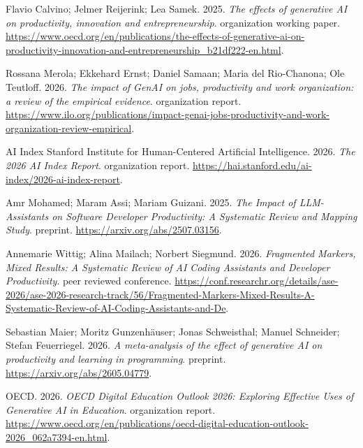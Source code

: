{\small\setlength{\parskip}{0pt}\begin{description}[leftmargin=2em,labelwidth=1.5em,itemsep=1pt,parsep=0pt]
\item[1.] \hypertarget{ref-oecdproductivity2025}{} Flavio Calvino; Jelmer Reijerink; Lea Samek. 2025. \textit{The effects of generative AI on productivity, innovation and entrepreneurship}. organization working paper. \url{https://www.oecd.org/en/publications/the-effects-of-generative-ai-on-productivity-innovation-and-entrepreneurship\_b21df222-en.html}.

\item[2.] \hypertarget{ref-iloreview2026}{} Rossana Merola; Ekkehard Ernst; Daniel Samaan; Maria del Rio-Chanona; Ole Teutloff. 2026. \textit{The impact of GenAI on jobs, productivity and work organization: a review of the empirical evidence}. organization report. \url{https://www.ilo.org/publications/impact-genai-jobs-productivity-and-work-organization-review-empirical}.

\item[3.] \hypertarget{ref-aiindex2026}{} AI Index Stanford Institute for Human-Centered Artificial Intelligence. 2026. \textit{The 2026 AI Index Report}. organization report. \url{https://hai.stanford.edu/ai-index/2026-ai-index-report}.

\item[4.] \hypertarget{ref-ref-59e035c44a}{} Amr Mohamed; Maram Assi; Mariam Guizani. 2025. \textit{The Impact of LLM-Assistants on Software Developer Productivity: A Systematic Review and Mapping Study}. preprint. \url{https://arxiv.org/abs/2507.03156}.

\item[5.] \hypertarget{ref-wittig2026}{} Annemarie Wittig; Alina Mailach; Norbert Siegmund. 2026. \textit{Fragmented Markers, Mixed Results: A Systematic Review of AI Coding Assistants and Developer Productivity}. peer reviewed conference. \url{https://conf.researchr.org/details/ase-2026/ase-2026-research-track/56/Fragmented-Markers-Mixed-Results-A-Systematic-Review-of-AI-Coding-Assistants-and-De}.

\item[6.] \hypertarget{ref-maier2026}{} Sebastian Maier; Moritz Gunzenhäuser; Jonas Schweisthal; Manuel Schneider; Stefan Feuerriegel. 2026. \textit{A meta-analysis of the effect of generative AI on productivity and learning in programming}. preprint. \url{https://arxiv.org/abs/2605.04779}.

\item[7.] \hypertarget{ref-oecdeducation2026}{} OECD. 2026. \textit{OECD Digital Education Outlook 2026: Exploring Effective Uses of Generative AI in Education}. organization report. \url{https://www.oecd.org/en/publications/oecd-digital-education-outlook-2026\_062a7394-en.html}.


\end{description}}
